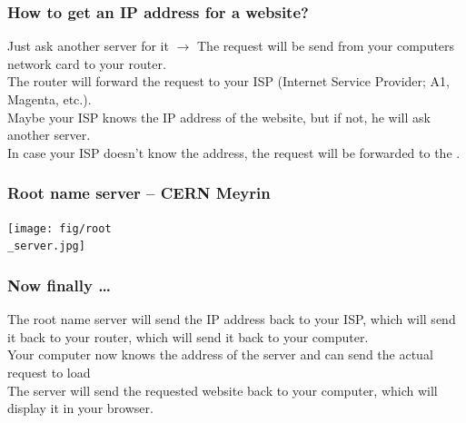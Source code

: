 \documentclass{beamer}
\begin{document}
\begin{frame}
  \frametitle{How to get an IP address for a website?}
  Just ask another server for it $\rightarrow$ \textbf{}
  \vspace{5mm}
  The request will be send from your computers network card to your router.\\ The router will forward the request to your ISP (Internet Service Provider; A1, Magenta, etc.).\\
  Maybe your ISP knows the IP address of the website, but if not, he will ask another server.\\
  \vspace{5mm}
  In case your ISP doesn't know the address, the request will be forwarded to the \textbf{}.\\
\end{frame}
\begin{frame}
  \frametitle{Root name server -- CERN Meyrin}
  \begin{center}
    \texttt{[image: fig/root\\\_server.jpg]}
  \end{center}
\end{frame}
\begin{frame}
  \frametitle{Now finally \dots}
  The root name server will send the IP address back to your ISP, which will send it back to your router, which will send it back to your computer.\\
  \vspace{5mm}
  Your computer now knows the address of the \texttt{} server and can send the actual request to load \texttt{}\\
  \vspace{5mm}
  The server will send the requested website back to your computer, which will display it in your browser.\\
\end{frame}
\end{document}

